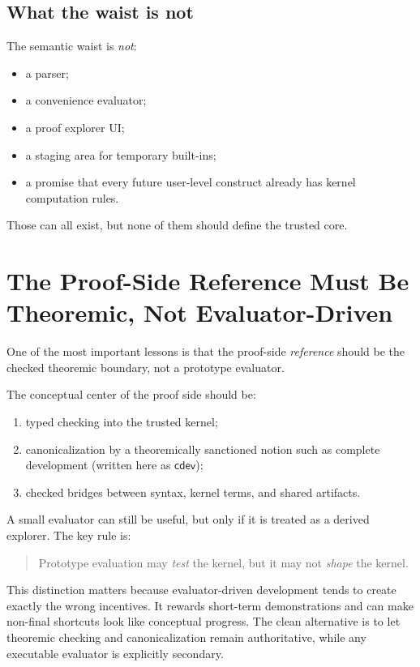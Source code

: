 \documentclass[11pt]{article}
\newcommand{\cdev}{\ensuremath{\mathsf{cdev}}}
\begin{document}
\subsection{What the waist is not}

The semantic waist is \emph{not}:
\begin{itemize}[leftmargin=2em]
  \item a parser;
  \item a convenience evaluator;
  \item a proof explorer UI;
  \item a staging area for temporary built-ins;
  \item a promise that every future user-level construct already has kernel
  computation rules.
\end{itemize}

Those can all exist, but none of them should define the trusted core.

\section{The Proof-Side Reference Must Be Theoremic, Not Evaluator-Driven}

One of the most important lessons is that the proof-side \emph{reference} should
be the checked theoremic boundary, not a prototype evaluator.

The conceptual center of the proof side should be:
\begin{enumerate}[leftmargin=2em]
  \item typed checking into the trusted kernel;
  \item canonicalization by a theoremically sanctioned notion such as complete
  development (written here as $\cdev$);
  \item checked bridges between syntax, kernel terms, and shared artifacts.
\end{enumerate}

A small evaluator can still be useful, but only if it is treated as a derived
explorer. The key rule is:

\begin{quote}
Prototype evaluation may \emph{test} the kernel, but it may not \emph{shape}
the kernel.
\end{quote}

This distinction matters because evaluator-driven development tends to create
exactly the wrong incentives. It rewards short-term demonstrations and can make
non-final shortcuts look like conceptual progress. The clean alternative is to
let theoremic checking and canonicalization remain authoritative, while any
executable evaluator is explicitly secondary.
\end{document}
